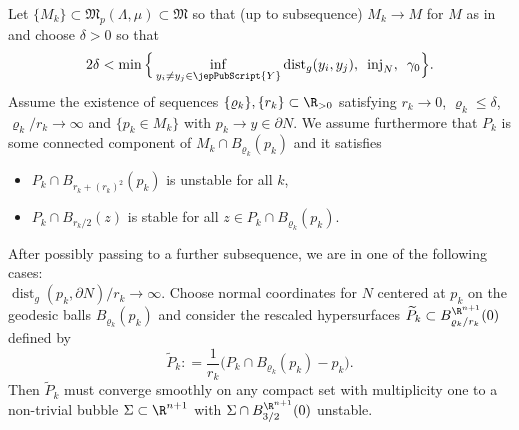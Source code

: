         	 	\begin{thm}\label{thm:blowup}
        	 		Let $\{M_k\}\subset \mathfrak{M}_p(\Lambda, \mu) \subset \mathfrak{M}$ so that (up to subsequence) $M_k\to M$ for $M$ as in \cite[Th.~29]{ACS17} and choose $\delta>0$ so that 
        	 		\begin{equation*}
        	 		2\delta<\min\Big\{\inf_{ y_i\neq y_j\in {\jepPubScript{Y}}} \operatorname{dist}_g(y_i,y_j),\,\,\, \operatorname{inj}_N,\,\,\, \gamma_0\Big\}.
        	 		\end{equation*} Assume the existence of sequences $\{\varrho_k\},\{r_k\}\subset \R_{>0}$ satisfying $r_k\to 0$, $\varrho_k\leqslant \delta$, $\varrho_k/r_k\to \infty$ and $\{p_k\in M_k\}$ with $p_k\to y\in \partial N$. We assume furthermore that $P_k$ is some connected component of $M_k\cap B_{\varrho_k}(p_k)$ and it satisfies
        	 		\begin{itemize}
        	 			\item $P_k\cap B_{r_k + (r_k)^2}(p_k)$ is unstable for all $k$,
        	 			\item $P_k\cap B_{r_k/2}(z)$ is stable for all $z\in P_k\cap B_{\varrho_k}(p_k)$. 
        	 		\end{itemize}
        	 		
        	 		After possibly passing to a further subsequence, we are in one of the following cases: \\
        	 		
        	 		 $\operatorname{dist}_g(p_k,\partial N)/r_k\to\infty$. Choose normal coordinates for $N$ centered at $p_k$ on the geodesic balls $B_{\varrho_k}(p_k)$ and consider the rescaled hypersurfaces $\widetilde{P}_k \subset B^{\R^{n+1}}_{\varrho_k/r_k}(0)$ defined by
        	 		\begin{equation*}
        	 		\widetilde{P}_k  : = \frac{1}{r_k} \big(P_k\cap B_{\varrho_k}(p_k)- p_k\big).
        	 		\end{equation*}		 Then $\widetilde{P}_k$ must converge smoothly on any compact set with multiplicity one to a non-trivial bubble $\Sigma\subset \R^{n+1}$ with $\Sigma\cap B^{\R^{n+1}}_{3/2}(0)$ unstable. \\
        	 		
        	 		
        	 		

\end{thm}
